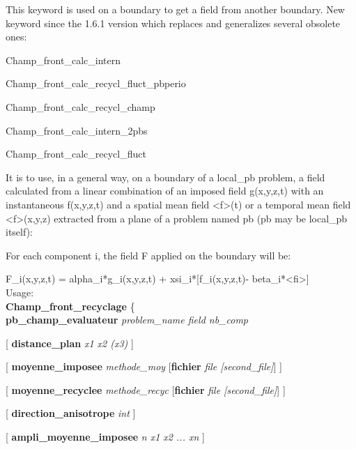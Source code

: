  This keyword is used on a boundary to get a field from another boundary. New keyword since the 1.6.1 version which replaces and generalizes several obsolete ones:
%

\hspace{1cm} Champ\_front\_calc\_intern
%

\hspace{1cm} Champ\_front\_calc\_recycl\_fluct\_pbperio
%

\hspace{1cm} Champ\_front\_calc\_recycl\_champ
%

\hspace{1cm} Champ\_front\_calc\_intern\_2pbs
%

\hspace{1cm} Champ\_front\_calc\_recycl\_fluct
%

It is to use, in a general way, on a boundary of a local\_pb problem, a field calculated from a linear combination of an imposed field g(x,y,z,t) with an instantaneous f(x,y,z,t) and a spatial mean field <f>(t) or a temporal mean field <f>(x,y,z) extracted from a plane of a problem named pb (pb may be local\_pb itself):

For each component i, the field F applied on the boundary will be:

F\_i(x,y,z,t) = alpha\_i*g\_i(x,y,z,t)  + xsi\_i*[f\_i(x,y,z,t)- beta\_i*<fi>]
%
\\

Usage: \\
\textbf{Champ\_front\_recyclage} \{ \\
%

\hspace{0.8cm} \textbf{pb\_champ\_evaluateur} \textit{problem\_name field nb\_comp}
%

\hspace{0.8cm} [ \textbf{distance\_plan} \textit{x1 x2 (x3)} ]
%

\hspace{0.8cm}  [ \textbf{moyenne\_imposee} \textit{methode\_moy} [\textbf{fichier} \textit{file [second\_file]}] ]
%

\hspace{0.8cm} [ \textbf{moyenne\_recyclee} \textit{methode\_recyc} [\textbf{fichier} \textit{file [second\_file]}] ]
%

\hspace{0.8cm} [ \textbf{direction\_anisotrope} \textit{int} ]
%

\hspace{0.8cm} [ \textbf{ampli\_moyenne\_imposee} \textit{n x1 x2 ... xn} ]
%

